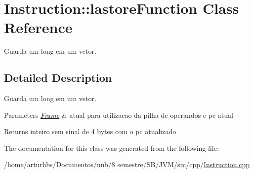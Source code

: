 \hypertarget{classInstruction_1_1lastoreFunction}{}\section{Instruction\+:\+:lastore\+Function Class Reference}
\label{classInstruction_1_1lastoreFunction}


Guarda um long em um vetor.  




\subsection{Detailed Description}
Guarda um long em um vetor. 


\begin{DoxyParams}{Parameters}
{\em \hyperlink{classFrame}{Frame}} & atual para utilizacao da pilha de operandos e pc atual \\
\hline
\end{DoxyParams}
\begin{DoxyReturn}{Returns}
inteiro sem sinal de 4 bytes com o pc atualizado 
\end{DoxyReturn}


The documentation for this class was generated from the following file\+:\begin{DoxyCompactItemize}
\item 
/home/arturhbs/\+Documentos/unb/8 semestre/\+S\+B/\+J\+V\+M/src/cpp/\hyperlink{Instruction_8cpp}{Instruction.\+cpp}\end{DoxyCompactItemize}
